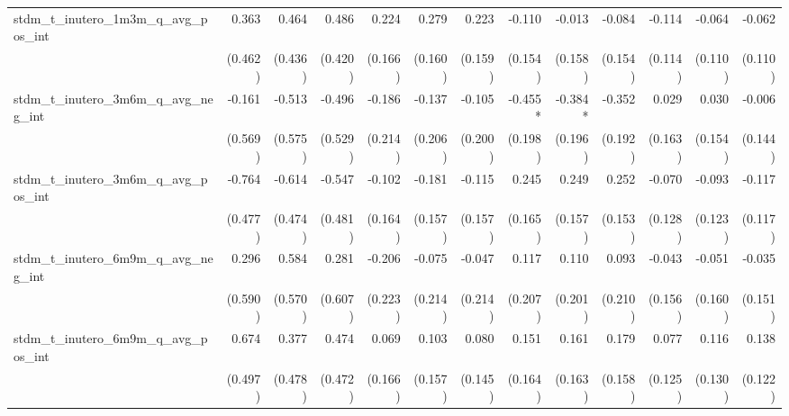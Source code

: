 \begin{tabular}{lrrrrrrrrrrrr}
stdm\_t\_inutero\_1m3m\_q\_avg\_pos\_int    &        0.363 &        0.464 &        0.486 &        0.224 &        0.279 &        0.223 &       -0.110 &       -0.013 &       -0.084 &       -0.114 &       -0.064 &       -0.062 \\ 
                                            &      (0.462) &      (0.436) &      (0.420) &      (0.166) &      (0.160) &      (0.159) &      (0.154) &      (0.158) &      (0.154) &      (0.114) &      (0.110) &      (0.110) \\ 
stdm\_t\_inutero\_3m6m\_q\_avg\_neg\_int    &       -0.161 &       -0.513 &       -0.496 &       -0.186 &       -0.137 &       -0.105 &      -0.455* &      -0.384* &       -0.352 &        0.029 &        0.030 &       -0.006 \\ 
                                            &      (0.569) &      (0.575) &      (0.529) &      (0.214) &      (0.206) &      (0.200) &      (0.198) &      (0.196) &      (0.192) &      (0.163) &      (0.154) &      (0.144) \\ 
stdm\_t\_inutero\_3m6m\_q\_avg\_pos\_int    &       -0.764 &       -0.614 &       -0.547 &       -0.102 &       -0.181 &       -0.115 &        0.245 &        0.249 &        0.252 &       -0.070 &       -0.093 &       -0.117 \\ 
                                            &      (0.477) &      (0.474) &      (0.481) &      (0.164) &      (0.157) &      (0.157) &      (0.165) &      (0.157) &      (0.153) &      (0.128) &      (0.123) &      (0.117) \\ 
stdm\_t\_inutero\_6m9m\_q\_avg\_neg\_int    &        0.296 &        0.584 &        0.281 &       -0.206 &       -0.075 &       -0.047 &        0.117 &        0.110 &        0.093 &       -0.043 &       -0.051 &       -0.035 \\ 
                                            &      (0.590) &      (0.570) &      (0.607) &      (0.223) &      (0.214) &      (0.214) &      (0.207) &      (0.201) &      (0.210) &      (0.156) &      (0.160) &      (0.151) \\ 
stdm\_t\_inutero\_6m9m\_q\_avg\_pos\_int    &        0.674 &        0.377 &        0.474 &        0.069 &        0.103 &        0.080 &        0.151 &        0.161 &        0.179 &        0.077 &        0.116 &        0.138 \\ 
                                            &      (0.497) &      (0.478) &      (0.472) &      (0.166) &      (0.157) &      (0.145) &      (0.164) &      (0.163) &      (0.158) &      (0.125) &      (0.130) &      (0.122) \\ 

\end{tabular}

